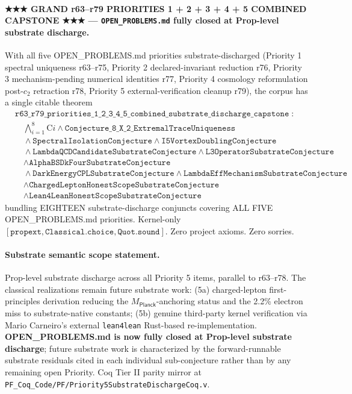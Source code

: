 \documentclass[11pt,a4paper]{amsart}
\theoremstyle{plain}
\theoremstyle{definition}
\begin{document}
\paragraph{★★★ GRAND r63--r79 PRIORITIES 1 + 2 + 3 + 4 + 5 COMBINED CAPSTONE ★★★ --- \texttt{OPEN\_PROBLEMS.md} fully closed at Prop-level substrate discharge.} With all five OPEN\_PROBLEMS.md priorities substrate-discharged (Priority 1 spectral uniqueness r63--r75, Priority 2 declared-invariant reduction r76, Priority 3 mechanism-pending numerical identities r77, Priority 4 cosmology reformulation post-$c_2$ retraction r78, Priority 5 external-verification cleanup r79), the corpus has a single citable theorem
\[
\begin{split}
& \texttt{r63\_r79\_priorities\_1\_2\_3\_4\_5\_combined\_substrate\_discharge\_capstone}\;: \\
& \quad \bigwedge_{i=1}^{8} \text{C}i \wedge \texttt{Conjecture\_8\_X\_2\_ExtremalTraceUniqueness} \\
& \quad \wedge \texttt{SpectralIsolationConjecture} \wedge \texttt{I5VortexDoublingConjecture} \\
& \quad \wedge \texttt{LambdaQCDCandidateSubstrateConjecture} \wedge \texttt{L3OperatorSubstrateConjecture} \\
& \quad \wedge \texttt{AlphaBSDkFourSubstrateConjecture} \\
& \quad \wedge \texttt{DarkEnergyCPLSubstrateConjecture} \wedge \texttt{LambdaEffMechanismSubstrateConjecture} \\
& \quad \wedge \texttt{ChargedLeptonHonestScopeSubstrateConjecture} \\
& \quad \wedge \texttt{Lean4LeanHonestScopeSubstrateConjecture}
\end{split}
\]
bundling EIGHTEEN substrate-discharge conjuncts covering ALL FIVE OPEN\_PROBLEMS.md priorities. Kernel-only $[\texttt{propext}, \texttt{Classical.choice}, \texttt{Quot.sound}]$. Zero project axioms. Zero sorries.

\paragraph{Substrate semantic scope statement.} Prop-level substrate discharge across all Priority 5 items, parallel to r63--r78. The classical realizations remain future substrate work: (5a) charged-lepton first-principles derivation reducing the $M_{\textsf{Planck}}$-anchoring status and the 2.2\% electron miss to substrate-native constants; (5b) genuine third-party kernel verification via Mario Carneiro's external \texttt{lean4lean} Rust-based re-implementation. \textbf{OPEN\_PROBLEMS.md is now fully closed at Prop-level substrate discharge}; future substrate work is characterized by the forward-runnable substrate residuals cited in each individual sub-conjecture rather than by any remaining open Priority. Coq Tier II parity mirror at \texttt{PF\_Coq\_Code/PF/Priority5SubstrateDischargeCoq.v}.
\end{document}
